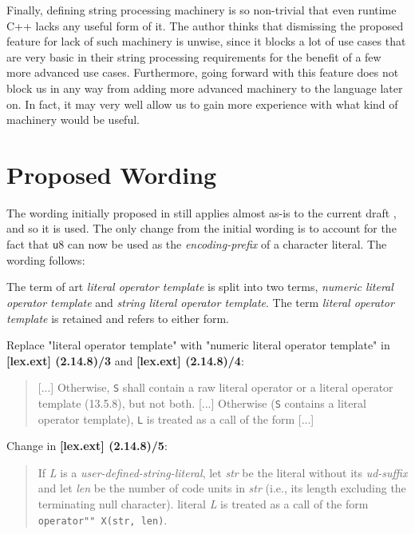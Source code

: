 \documentclass{wg21}
\newcommand{\cc}[1]{\texttt{#1}}
\begin{document}
Finally, defining string processing machinery is so non-trivial that even
runtime C++ lacks any useful form of it. The author thinks that dismissing
the proposed feature for lack of such machinery is unwise, since it blocks
a lot of use cases that are very basic in their string processing requirements
for the benefit of a few more advanced use cases. Furthermore, going forward
with this feature does not block us in any way from adding more advanced
machinery to the language later on. In fact, it may very well allow us to
gain more experience with what kind of machinery would be useful.


\section{Proposed Wording}
The wording initially proposed in \cite{N3599} still applies almost as-is to
the current draft \cite{N4606}, and so it is used. The only change from the
initial wording is to account for the fact that \cc u8 can now be used as the
\textit{encoding-prefix} of a character literal. The wording follows:

The term of art \textit{literal operator template} is split into two terms,
\textit{numeric literal operator template} and \textit{string literal operator
template}. The term \textit{literal operator template} is retained and refers
to either form.

Replace "literal operator template" with "numeric literal operator template"
in \textbf{[lex.ext] (2.14.8)/3} and \textbf{[lex.ext] (2.14.8)/4}:

\begin{quote}
  [...] Otherwise, \cc S shall contain a raw literal operator or a
   literal operator template (13.5.8), but not both. [...]
  Otherwise (\cc S contains a  literal operator template),
  \cc L is treated as a call of the form [...]
\end{quote}

Change in \textbf{[lex.ext] (2.14.8)/5}:

\begin{quote}
  If \textit{L} is a \textit{user-defined-string-literal},  let \textit{str} be the literal without its
  \textit{ud-suffix}\added{,} and let \textit{len} be the number of code units
  in \textit{str} (i.e., its length excluding the terminating null character).
    literal
  \textit{L} is treated as a call of the form \texttt{operator"" X(str, len)}.
\end{quote}
\end{document}
